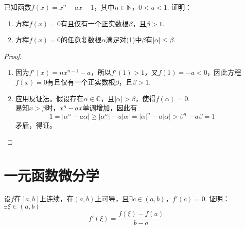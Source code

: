 \begin{proposition}

    已知函数\(f(x) = x^n - ax - 1\)，其中\(n \in \mathbb{N}\)，\(0 < a < 1\). 证明：

    \begin{enumerate}

        \item 方程\(f(x) = 0\)有且仅有一个正实数根\(\beta\)，且\(\beta > 1\).
        
        \item 方程\(f(x) = 0\)的任意复数根\(\alpha\)满足对(1)中\(\beta\)有\(|\alpha| \leq \beta\).
        
    \end{enumerate}

\end{proposition}

\begin{proof}

    \begin{enumerate}

        \item 因为\(f'(x) = nx^{n - 1} - a\)，所以\(f'(1) > 1\)，又\(f(1) = -a < 0\)，因此方程\(f(x) = 0\)有且仅有一个正实数根\(\beta\)，且\(\beta > 1\).
        
        \item 
            应用反证法。假设存在\(\alpha \in \mathbb{C}\)，且\(|\alpha| > \beta\)，使得\(f(\alpha) = 0\). \\
            易知\(x > \beta\)时，\(x^n - ax\)单调增加，因此有
            \[1 = |\alpha^n - a\alpha| \geq |\alpha^n| - a|\alpha| = |\alpha|^n - a|\alpha| > \beta^n - a\beta = 1\]
            矛盾，得证。

    \end{enumerate}

\end{proof}

\section{一元函数微分学}

\begin{proposition}
    
    设\(f\)在\([a, b]\)上连续，在\((a, b)\)上可导，且\(\exists c \in (a, b)\)，\(f'(c) = 0\).
    证明：\(\exists \xi \in (a, b)\)
    \[f'(\xi) = \dfrac{f(\xi) - f(a)}{b - a}\]

\end{proposition}

